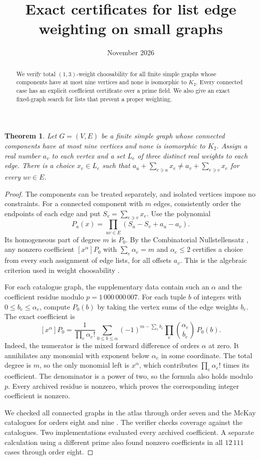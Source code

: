 \documentclass[10pt]{article}
\title{Exact certificates for list edge weighting on small graphs}
\author{}
\date{November 2026}
\newtheorem{theorem}{Theorem}
\begin{document}
\maketitle

\begin{abstract}
We verify total $(1,3)$-weight choosability for all finite simple graphs whose
components have at most nine vertices and none is isomorphic to $K_2$. Every connected
case has an explicit coefficient certificate over a prime field. We also give
an exact fixed-graph search for lists that prevent a proper weighting.
\end{abstract}

\begin{theorem}
Let $G=(V,E)$ be a finite simple graph whose connected components have at
most nine vertices and none is isomorphic to $K_2$.
Assign a real number $a_v$ to each vertex and a set $L_e$ of three
distinct real weights to each edge. There is a choice $x_e\in L_e$ such that
$a_u+\sum_{e\ni u}x_e\ne a_v+\sum_{e\ni v}x_e$ for every $uv\in E$.
\end{theorem}

\begin{proof}
The components can be treated separately, and isolated vertices impose no
constraints. For a connected component with $m$ edges, consistently order
the endpoints of each edge and put $S_v=\sum_{e\ni v}x_e$. Use the polynomial
\[
P_a(x)=\prod_{uv\in E}(S_u-S_v+a_u-a_v).
\]
Its homogeneous part of degree $m$ is $P_0$. By the Combinatorial
Nullstellensatz \cite{alon}, any nonzero coefficient $[x^\alpha]P_0$ with
$\sum_e\alpha_e=m$ and $\alpha_e\leq 2$ certifies a choice from every such
assignment of edge lists, for all offsets $a_v$. This is the algebraic
criterion used in weight choosability \cite{bgn,zhu}.

For each catalogue graph, the supplementary data contain such an $\alpha$
and the coefficient residue modulo $p=1\,000\,000\,007$. For each tuple
$b$ of integers with $0\leq b_e\leq \alpha_e$, compute $P_0(b)$ by taking
the vertex sums of the edge weights $b_e$. The exact coefficient is
\[
[x^\alpha]P_0=
\frac{1}{\prod_e\alpha_e!}
\sum_{0\leq b\leq\alpha}(-1)^{m-\sum_e b_e}
\prod_e\binom{\alpha_e}{b_e}\,P_0(b).
\]
Indeed, the numerator is the mixed forward difference of orders $\alpha$ at
zero. It annihilates any monomial with exponent below $\alpha_e$ in some
coordinate. The total degree is $m$, so the only monomial left is
$x^\alpha$, which contributes $\prod_e \alpha_e!$ times its coefficient.
The denominator is a power of two, so the formula also holds modulo $p$.
Every archived residue is nonzero, which proves the corresponding integer
coefficient is nonzero.

We checked all connected graphs in the atlas through order seven and the
McKay catalogues for orders eight and nine \cite{mckay}. The verifier checks
coverage against the catalogues. Two implementations evaluated every
archived coefficient. A separate calculation using a different prime also
found nonzero coefficients in all $12\,111$ cases through order eight.
\end{proof}
\end{document}
